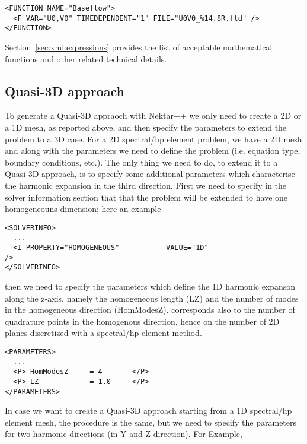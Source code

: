 \begin{lstlisting}[style=XMLStyle]
<FUNCTION NAME="Baseflow">
  <F VAR="U0,V0" TIMEDEPENDENT="1" FILE="U0V0_%14.8R.fld" />
</FUNCTION>
\end{lstlisting}

Section~\ref{sec:xml:expressions} provides the list of acceptable
mathematical functions and other related technical details.

\subsection{Quasi-3D approach}

To generate a Quasi-3D appraoch with Nektar++ we only need to create a 2D or a
1D mesh, as reported above, and then specify the parameters to extend the
problem to a 3D case. For a 2D spectral/hp element problem, we have a 2D mesh
and along with the parameters we need to define the problem (i.e. equation type,
boundary conditions, etc.). The only thing we need to do, to extend it to a
Quasi-3D approach, is to specify some additional parameters which characterise
the harmonic expansion in the third direction. First we need to specify in the
solver information section that that the problem will be extended to have one
homogeneouns dimension; here an example

\begin{lstlisting}[style=XMLStyle]
<SOLVERINFO>
  ...
  <I PROPERTY="HOMOGENEOUS"           VALUE="1D"                       />
</SOLVERINFO>
\end{lstlisting}

then we need to specify the parameters which define the 1D harmonic expanson
along the z-axis, namely the homogeneous length (LZ) and the number of modes in
the homogeneous direction (HomModesZ).  corresponds also to the number
of quadrature points in the homogenous direction, hence on the number of 2D
planes discretized with a spectral/hp element method.

\begin{lstlisting}[style=XMLStyle]
<PARAMETERS>
  ...
  <P> HomModesZ     = 4       </P>
  <P> LZ            = 1.0     </P>
</PARAMETERS>
\end{lstlisting}

In case we want to create a Quasi-3D approach starting from a 1D spectral/hp
element mesh, the procedure is the same, but we need to specify the parameters
for two harmonic directions (in Y and Z direction). For Example,

